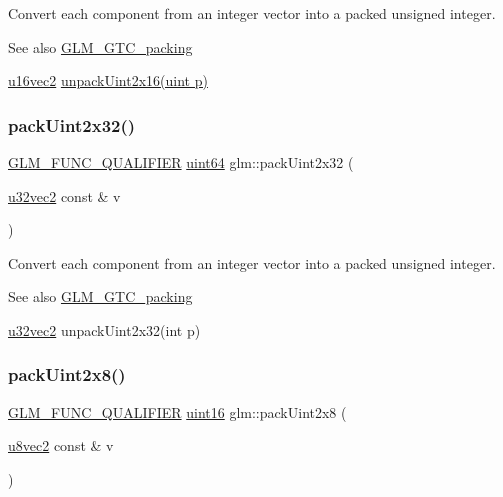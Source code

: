 Convert each component from an integer vector into a packed unsigned integer.

\begin{DoxySeeAlso}{See also}
\hyperlink{group__gtc__packing}{G\+L\+M\+\_\+\+G\+T\+C\+\_\+packing} 

\hyperlink{group__gtc__type__precision_ga50bd2ceeb100a187e7c46f135269a0ec}{u16vec2} \hyperlink{group__gtc__packing_ga7778efa924e6efc386cb9f373bb06b72}{unpack\+Uint2x16(uint p)} 
\end{DoxySeeAlso}
\mbox{\label{group__gtc__packing_ga4c4e4d6ab81a6b14cf066b40b6967c0a}} 
\subsubsection{\texorpdfstring{pack\+Uint2x32()}{packUint2x32()}}
{\footnotesize\ttfamily \hyperlink{setup_8hpp_a33fdea6f91c5f834105f7415e2a64407}{G\+L\+M\+\_\+\+F\+U\+N\+C\+\_\+\+Q\+U\+A\+L\+I\+F\+I\+ER} \hyperlink{group__gtc__type__precision_gae3632bf9b37da66233d78930dd06378a}{uint64} glm\+::pack\+Uint2x32 (\begin{DoxyParamCaption}\item[{\hyperlink{group__gtc__type__precision_gad854a1005ce84d8f6e8f05e42893f5c9}{u32vec2} const \&}]{v }\end{DoxyParamCaption})}

Convert each component from an integer vector into a packed unsigned integer.

\begin{DoxySeeAlso}{See also}
\hyperlink{group__gtc__packing}{G\+L\+M\+\_\+\+G\+T\+C\+\_\+packing} 

\hyperlink{group__gtc__type__precision_gad854a1005ce84d8f6e8f05e42893f5c9}{u32vec2} unpack\+Uint2x32(int p) 
\end{DoxySeeAlso}
\mbox{\label{group__gtc__packing_ga4a431a30aa5dfb425be3ea84fe561844}} 
\subsubsection{\texorpdfstring{pack\+Uint2x8()}{packUint2x8()}}
{\footnotesize\ttfamily \hyperlink{setup_8hpp_a33fdea6f91c5f834105f7415e2a64407}{G\+L\+M\+\_\+\+F\+U\+N\+C\+\_\+\+Q\+U\+A\+L\+I\+F\+I\+ER} \hyperlink{group__gtc__type__precision_gad8c2939e1fdd8e5828b31d95c52255d5}{uint16} glm\+::pack\+Uint2x8 (\begin{DoxyParamCaption}\item[{\hyperlink{group__gtc__type__precision_ga01e28d0272428f94d22ea6111f0112be}{u8vec2} const \&}]{v }\end{DoxyParamCaption})}

